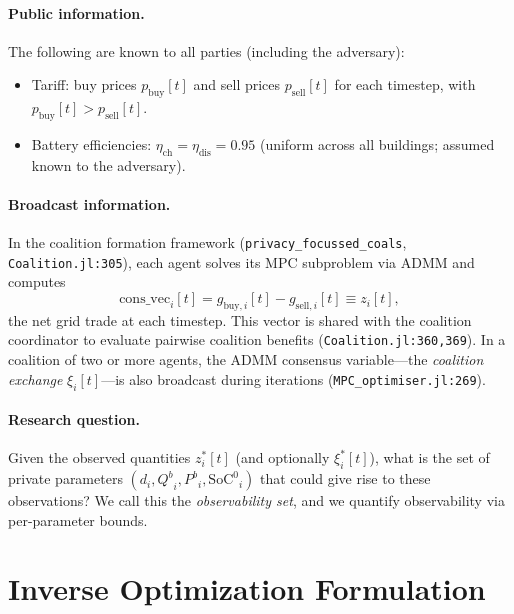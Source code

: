 \documentclass[11pt,a4paper]{article}
\newcommand{\pb}{p_{\text{buy}}}
\newcommand{\ps}{p_{\text{sell}}}
\newcommand{\netload}{d}
\newcommand{\Qb}{{Q^b}}
\newcommand{\Pb}{{P^b}}
\newcommand{\SoC}{{\text{SoC}^0}}
\newcommand{\ce}{\xi}
\begin{document}
\paragraph{Public information.}
The following are known to all parties (including the adversary):
\begin{itemize}[nosep]
    \item Tariff: buy prices $\pb[t]$ and sell prices $\ps[t]$ for each timestep, with $\pb[t] > \ps[t]$.
    \item Battery efficiencies: $\eta_{\text{ch}} = \eta_{\text{dis}} = 0.95$ (uniform across all buildings; assumed known to the adversary).
\end{itemize}

\paragraph{Broadcast information.}
In the coalition formation framework (\texttt{privacy\_focussed\_coals}, \texttt{Coalition.jl:305}), each agent solves its MPC subproblem via ADMM and computes
\begin{equation}\label{eq:cons_vec}
    \text{cons\_vec}_i[t] = g_{\text{buy},i}[t] - g_{\text{sell},i}[t] \equiv z_i[t],
\end{equation}
the net grid trade at each timestep. This vector is shared with the coalition coordinator to evaluate pairwise coalition benefits (\texttt{Coalition.jl:360,369}). In a coalition of two or more agents, the ADMM consensus variable---the \emph{coalition exchange} $\ce_i[t]$---is also broadcast during iterations (\texttt{MPC\_optimiser.jl:269}).

\paragraph{Research question.}
Given the observed quantities $z_i^*[t]$ (and optionally $\ce_i^*[t]$), what is the set of private parameters $(\netload_i, \Qb_i, \Pb_i, \SoC_i)$ that could give rise to these observations? We call this the \emph{observability set}, and we quantify observability via per-parameter bounds.

\section{Inverse Optimization Formulation}\label{sec:formulation}
\end{document}
